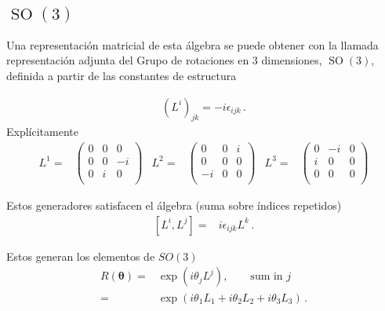\subsection{$\operatorname{SO}(3)$}
Una representación matricial de esta álgebra se puede obtener con la llamada representación adjunta del Grupo de rotaciones en 3 dimensiones, $\operatorname{SO}(3)$, definida a partir de las constantes de estructura \cite{Veltman}
\begin{frame}
\begin{align}
  \label{eq:so3adj}
  (L^i)_{jk}=-i\epsilon_{ijk}\,.
\end{align}
Explícitamente
\begin{align*}
  L^1=&
  \begin{pmatrix}
   0 & 0 & 0\\
   0 & 0 & -i\\
   0 & i & 0 \\
  \end{pmatrix}&
 L^2=&
 \begin{pmatrix}
  0 & 0  & i \\ 
  0 & 0  & 0 \\
 -i & 0  & 0 \\
 \end{pmatrix}&
 L^3=&
 \begin{pmatrix}
   0 & -i & 0\\
   i & 0  & 0\\
   0 & 0 & 0\\
 \end{pmatrix}
\end{align*}

Estos generadores satisfacen el álgebra (suma sobre índices repetidos)
\begin{align}
  \left[ L^i,L^j \right]=& i \epsilon_{ijk}L^{k}\,.
\end{align}
\end{frame}
Estos generan los elementos de $SO(3)$
\begin{align}
  R(\boldsymbol{\theta})=&\exp(i \theta_j L^{j}),\qquad\text{sum in $j$}\nonumber\\
                 =&\exp(i\theta_1 L_1+i\theta_2 L_2+i\theta_3 L_3)\,.
\end{align}


